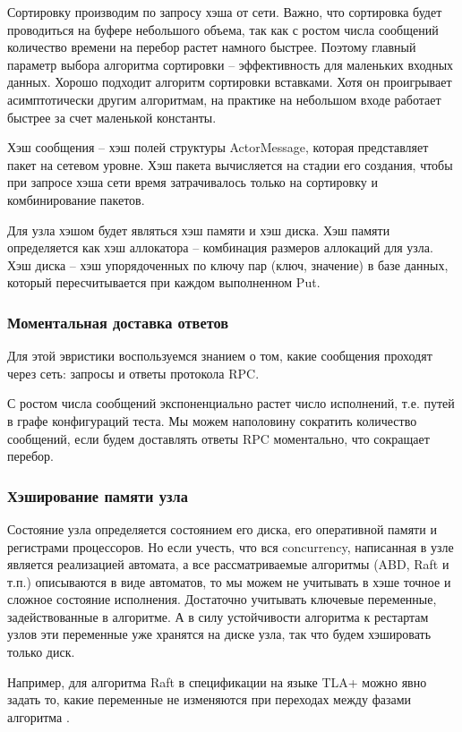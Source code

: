 Сортировку производим по запросу хэша от сети. Важно, что сортировка будет проводиться на буфере небольшого объема, так как с ростом числа сообщений количество времени на перебор растет намного быстрее. Поэтому главный параметр выбора алгоритма сортировки – эффективность для маленьких входных данных. Хорошо подходит алгоритм сортировки вставками. Хотя он проигрывает асимптотически другим алгоритмам, на практике на небольшом входе работает быстрее за счет маленькой константы.

Хэш сообщения – хэш полей структуры ActorMessage, которая представляет пакет на сетевом уровне. Хэш пакета вычисляется на стадии его создания, чтобы при запросе хэша сети время затрачивалось только на сортировку и комбинирование пакетов.

Для узла хэшом будет являться хэш памяти и хэш диска. Хэш памяти определяется как хэш аллокатора – комбинация размеров аллокаций для узла. Хэш диска – хэш упорядоченных по ключу пар (ключ, значение) в базе данных, который пересчитывается при каждом выполненном Put. 

\subsubsection{Моментальная доставка ответов}

Для этой эвристики воспользуемся знанием о том, какие сообщения проходят через сеть: запросы и ответы протокола RPC.

С ростом числа сообщений экспоненциально растет число исполнений, т.е. путей в графе конфигураций теста. Мы можем наполовину сократить количество сообщений, если будем доставлять ответы RPC моментально, что сокращает перебор.

\subsubsection{Хэширование памяти узла}

Состояние узла определяется состоянием его диска, его оперативной памяти и регистрами процессоров. Но если учесть, что вся concurrency, написанная в узле является реализацией автомата, а все рассматриваемые алгоритмы (ABD, Raft и т.п.) описываются в виде автоматов, то мы можем не учитывать в хэше точное и сложное состояние исполнения. Достаточно учитывать ключевые переменные, задействованные в алгоритме. А в силу устойчивости алгоритма к рестартам узлов эти переменные уже хранятся на диске узла, так что будем хэшировать только диск.

Например, для алгоритма Raft в спецификации на языке TLA+ можно явно задать то, какие переменные не изменяются при переходах между фазами алгоритма \cite{raft}.
